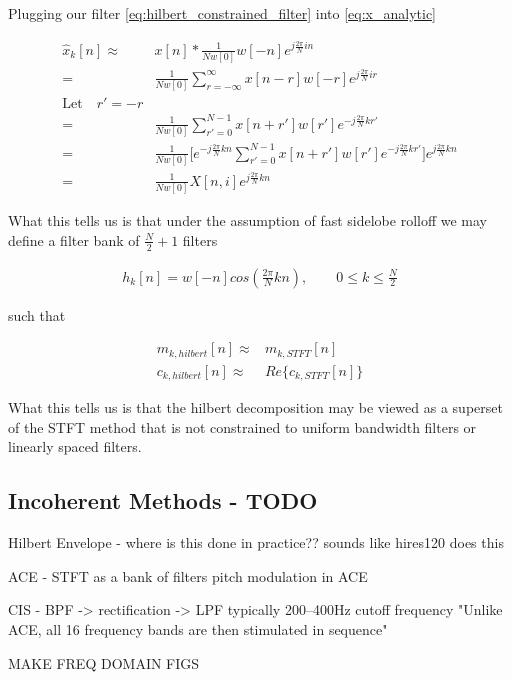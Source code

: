 \documentclass [11pt, proquest] {uwthesis}[2015/03/03]
\begin{document}
Plugging our filter \ref{eq:hilbert_constrained_filter} into \ref{eq:x_analytic}

\begin{align}
\widehat{x}_k[n] \approx& x[n] * \frac{1}{Nw[0]}w[-n]e^{j\frac{2\pi}{N}in} \nonumber \\
=& \frac{1}{Nw[0]}\sum\limits_{r=-\infty}^{\infty}x[n - r] w[-r] e^{j\frac{2\pi}{N}ir} \nonumber \\
\textrm{Let} \quad r' = -r \nonumber \\
=& \frac{1}{Nw[0]}\sum\limits_{r'=0}^{N-1} x[n + r'] w[r'] e^{-j\frac{2\pi}{N}kr'} \nonumber \\
=& \frac{1}{Nw[0]}\bigg[e^{-j\frac{2\pi}{N}kn} \sum\limits_{r'=0}^{N-1} x[n + r'] w[r'] e^{-j\frac{2\pi}{N}kr'}\bigg]e^{j\frac{2\pi}{N}kn} \nonumber \\
=& \frac{1}{Nw[0]}X[n,i]e^{j\frac{2\pi}{N}kn}
\end{align}

What this tells us is that under the assumption of fast sidelobe rolloff we may define a filter bank of $\frac{N}{2} + 1$ filters

\begin{align}
h_k[n] = w[-n]cos(\frac{2\pi}{N}kn), \qquad 0 \leq k \leq \frac{N}{2}
\end{align}

such that

\begin{align}
m_{k,hilbert}[n] \approx& m_{k,STFT}[n] \\
c_{k,hilbert}[n] \approx& Re\{c_{k,STFT}[n]\}
\end{align}

What this tells us is that the hilbert decomposition may be viewed as a superset of the STFT method that is not constrained to uniform bandwidth filters or linearly spaced filters.

\subsection{Incoherent Methods - TODO}

Hilbert Envelope - where is this done in practice??
	sounds like hires120 does this

ACE - STFT as a bank of filters
pitch modulation in ACE


CIS - BPF -> rectification -> LPF   
	typically 200–400Hz cutoff frequency
	"Unlike ACE, all 16 frequency bands are then stimulated in sequence"


MAKE FREQ DOMAIN FIGS
\end{document}
